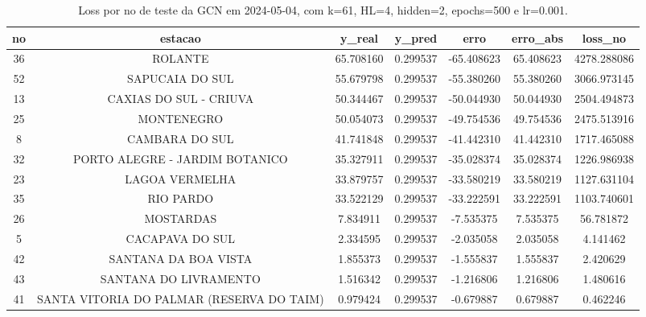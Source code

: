 \begin{table}[h]
\centering
\caption{Loss por no de teste da GCN em 2024-05-04, com k=61, HL=4, hidden=2, epochs=500 e lr=0.001.}
\label{tab:gcn_loss_k61_hl4_h2_e500_d20240504}
\begin{tabular}{ccccccc}
\toprule
no & estacao & y\_real & y\_pred & erro & erro\_abs & loss\_no \\
\midrule
36 & ROLANTE & 65.708160 & 0.299537 & -65.408623 & 65.408623 & 4278.288086 \\
52 & SAPUCAIA DO SUL & 55.679798 & 0.299537 & -55.380260 & 55.380260 & 3066.973145 \\
13 & CAXIAS DO SUL - CRIUVA & 50.344467 & 0.299537 & -50.044930 & 50.044930 & 2504.494873 \\
25 & MONTENEGRO & 50.054073 & 0.299537 & -49.754536 & 49.754536 & 2475.513916 \\
8 & CAMBARA DO SUL & 41.741848 & 0.299537 & -41.442310 & 41.442310 & 1717.465088 \\
32 & PORTO ALEGRE - JARDIM BOTANICO & 35.327911 & 0.299537 & -35.028374 & 35.028374 & 1226.986938 \\
23 & LAGOA VERMELHA & 33.879757 & 0.299537 & -33.580219 & 33.580219 & 1127.631104 \\
35 & RIO PARDO & 33.522129 & 0.299537 & -33.222591 & 33.222591 & 1103.740601 \\
26 & MOSTARDAS & 7.834911 & 0.299537 & -7.535375 & 7.535375 & 56.781872 \\
5 & CACAPAVA DO SUL & 2.334595 & 0.299537 & -2.035058 & 2.035058 & 4.141462 \\
42 & SANTANA DA BOA VISTA & 1.855373 & 0.299537 & -1.555837 & 1.555837 & 2.420629 \\
43 & SANTANA DO LIVRAMENTO & 1.516342 & 0.299537 & -1.216806 & 1.216806 & 1.480616 \\
41 & SANTA VITORIA DO PALMAR (RESERVA DO TAIM) & 0.979424 & 0.299537 & -0.679887 & 0.679887 & 0.462246 \\
\bottomrule
\end{tabular}
\end{table}
